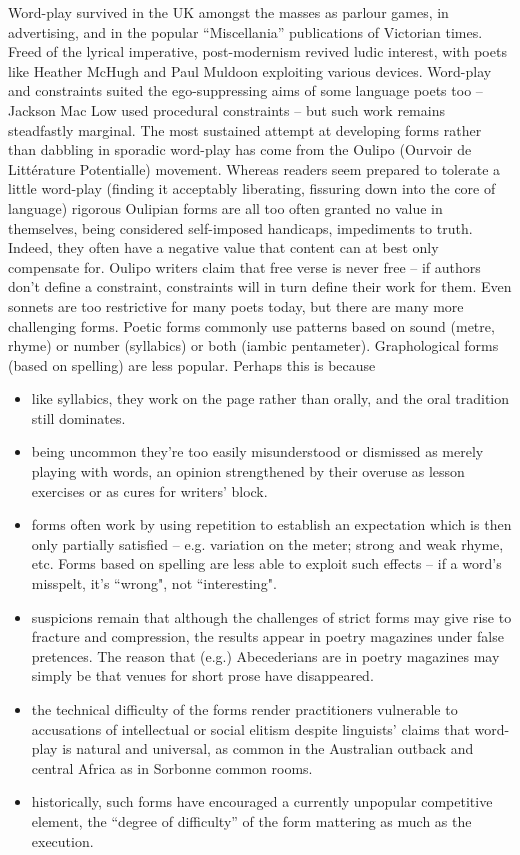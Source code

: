 \documentclass[11pt]{article}
\begin{document}
Word-play survived in the UK amongst the masses as parlour games, in advertising, and in the popular “Miscellania” publications of Victorian times. Freed of the lyrical imperative, post-modernism revived ludic interest, with poets like Heather McHugh and Paul Muldoon exploiting various devices. Word-play and constraints suited the ego-suppressing aims of some language poets too – Jackson Mac Low used procedural constraints – but such work remains steadfastly marginal. The most sustained attempt at developing forms rather than dabbling in sporadic word-play has come from the Oulipo (Ourvoir de Littérature Potentialle) movement. Whereas readers seem prepared to tolerate a little word-play (finding it acceptably liberating, fissuring down into the core of language) rigorous Oulipian forms are all too often granted no value in themselves, being considered self-imposed handicaps, impediments to truth. Indeed, they often have a negative value that content can at best only compensate for. Oulipo writers claim that free verse is never free – if authors don't define a constraint, constraints will in turn define their work for them. Even sonnets are too restrictive for many poets today, but there are many more challenging forms. Poetic forms commonly use patterns based on sound (metre, rhyme) or number (syllabics) or both (iambic pentameter). Graphological forms (based on spelling) are less popular. Perhaps this is because
\begin{itemize}  
\item      like syllabics, they work on the page rather than orally, and the oral tradition still dominates.
 \item     being uncommon they're too easily misunderstood or dismissed as merely playing with words, an opinion strengthened by their overuse as lesson exercises or as cures for writers' block.
 \item     forms often work by using repetition to establish an expectation which is then only partially satisfied – e.g. variation on the meter; strong and weak rhyme, etc. Forms based on spelling are less able to exploit such effects – if a word’s misspelt, it’s “wrong", not “interesting".
  \item    suspicions remain that although the challenges of strict forms may give rise to fracture and compression, the results appear in poetry magazines under false pretences. The reason that (e.g.) Abecederians are in poetry magazines may simply be that venues for short prose have disappeared.
 \item     the technical difficulty of the forms render practitioners vulnerable to accusations of intellectual or social elitism despite linguists' claims that word-play is natural and universal, as common in the Australian outback and central Africa as in Sorbonne common rooms.
\item      historically, such forms have encouraged a currently unpopular competitive element, the “degree of difficulty” of the form mattering as much as the execution.
\end{itemize}
\end{document}
